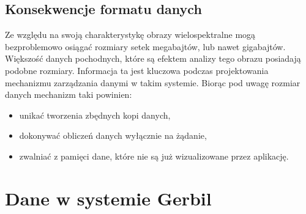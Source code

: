 \subsection{Konsekwencje formatu danych}
Ze względu na swoją charakterystykę obrazy wielospektralne mogą bezproblemowo osiągać rozmiary setek megabajtów, lub nawet gigabajtów. Większość danych pochodnych, które są efektem analizy tego obrazu posiadają podobne rozmiary. Informacja ta jest kluczowa podczas projektowania mechanizmu zarządzania danymi w takim systemie. Biorąc pod uwagę rozmiar danych mechanizm taki powinien:
\begin{itemize}
\item unikać tworzenia zbędnych kopi danych,
\item dokonywać obliczeń danych wyłącznie na żądanie,
\item zwalniać z pamięci dane, które nie są już wizualizowane przez aplikację.
\end{itemize}

\section{Dane w systemie Gerbil}

